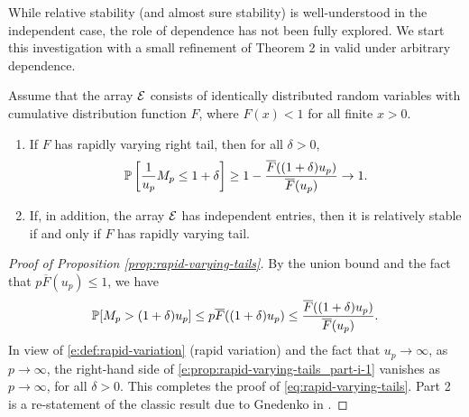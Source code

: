 While relative stability (and almost sure stability) is well-understood in the independent case, the role of dependence has not been fully explored.
We start this investigation with a small refinement of Theorem 2 in \citet{gnedenko1943distribution} valid under arbitrary dependence.

\begin{proposition} \label{prop:rapid-varying-tails}
Assume that the array ${\cal E}$ consists of identically distributed random 
variables with cumulative distribution function $F$, where $F(x)<1$ for all finite $x>0$. 
\begin{enumerate}
    \item If $F$ has rapidly varying right tail, then for all $\delta>0$,
        \begin{equation} \label{eq:rapid-varying-tails}
            \P\left[\frac{1}{u_p} M_p\le1+\delta\right] \ge 1 - \frac{\overline F((1+\delta)u_p)}{\overline F(u_p)} \to 1.
        \end{equation}
    \item If, in addition, the array ${\cal E}$ has independent entries, then it is relatively stable if and only if $F$ has rapidly varying tail.
    \label{prop:rapid-varying-tails_part-ii}
\end{enumerate}
\end{proposition}

\begin{proof}[Proof of Proposition \ref{prop:rapid-varying-tails}] 
By the union bound and the fact that 
$p\overline F(u_p) \le 1$, we have
\begin{align}\label{e:prop:rapid-varying-tails_part-i-1}
\P [ M_p > (1+\delta)u_p] \le p \overline F((1+\delta)u_p)
 \le \frac{\overline F((1+\delta)u_p)}{\overline F(u_p)}.
\end{align}
In view of \eqref{e:def:rapid-variation} (rapid variation) and the fact that $u_p\to\infty$, as $p\to\infty$, the right-hand side of \eqref{e:prop:rapid-varying-tails_part-i-1} vanishes 
as $p\to\infty$, for all $\delta>0$.  This completes the proof of \eqref{eq:rapid-varying-tails}. Part 2 is a re-statement of the classic result due to Gnedenko in \cite{gnedenko1943distribution}.
\end{proof}

